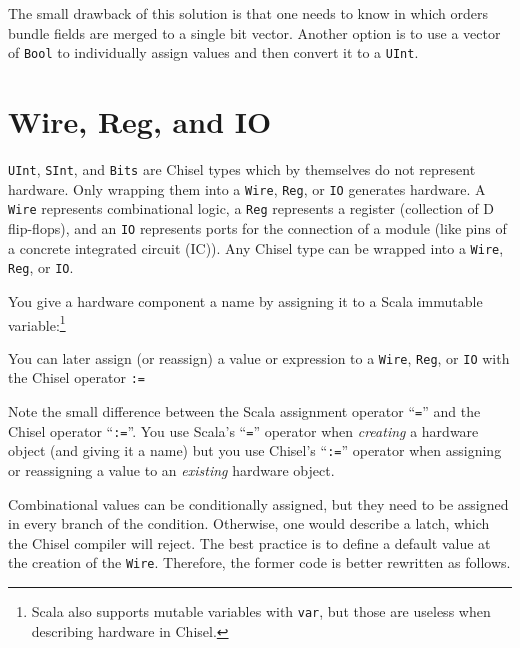 \documentclass[%
    10pt,
    headinclude, footexclude,
    openright, %
    notitlepage,
    cleardoubleempty,
    headsepline,
    pointlessnumbers,
    bibtotoc, idxtotoc,
    ]{scrbook}
\newcommand{\code}[1]{{\lstinline[basicstyle=\small\ttfamily]{#1}}}
\newcommand{\codefoot}[1]{{\lstinline[basicstyle=\footnotesize\ttfamily]{#1}}}
\begin{document}

\noindent The small drawback of this solution is that one needs to know in which orders
bundle fields are merged to a single bit vector. Another option is to use a vector of \code{Bool}
to individually assign values and then convert it to a \code{UInt}.


\section{Wire, Reg, and IO}

\code{UInt}, \code{SInt}, and \code{Bits} are Chisel types which by themselves do not
represent hardware. Only wrapping them into a \code{Wire}, \code{Reg}, or \code{IO}
generates hardware. A \code{Wire} represents combinational logic, a \code{Reg}
represents a register (collection of D flip-flops), and an \code{IO} represents ports
for the connection of a module (like pins of a concrete integrated circuit (IC)).
Any Chisel type can be wrapped into a \code{Wire}, \code{Reg}, or \code{IO}.

You give a hardware component a name by assigning it to a Scala immutable
variable:\footnote{Scala also supports mutable variables with \codefoot{var}, but those are useless
when describing hardware in Chisel.}


\noindent You can later assign (or reassign) a value or expression to a \code{Wire}, \code{Reg}, or \code{IO}
with the Chisel operator \code{:=}


\noindent Note the small difference between the Scala assignment operator ``\code{=}''
and the Chisel operator ``\code{:=}''. You use Scala's ``\code{=}'' operator when \emph{creating} a hardware
object (and giving it a name) but you use Chisel's ``\code{:=}'' operator when assigning or reassigning a value to
an \emph{existing} hardware object.

Combinational values can be conditionally assigned, but they need to be assigned in every branch
of the condition. Otherwise, one would describe a latch, which the Chisel compiler will reject.
The best practice is to define a default value at the creation of the \code{Wire}.
Therefore, the former code is better rewritten as follows.
\end{document}
